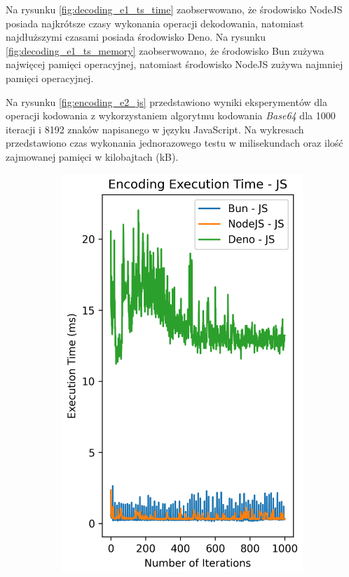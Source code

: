 Na rysunku \ref{fig:decoding_e1_ts_time} zaobserwowano, że środowisko NodeJS posiada najkrótsze czasy wykonania operacji dekodowania, natomiast najdłuższymi czasami posiada środowisko Deno. Na rysunku \ref{fig:decoding_e1_ts_memory} zaobserwowano, że środowisko Bun zużywa najwięcej pamięci operacyjnej, natomiast środowisko NodeJS zużywa najmniej pamięci operacyjnej.

Na rysunku \ref{fig:encoding_e2_js} przedstawiono wyniki eksperymentów dla operacji kodowania z wykorzystaniem algorytmu kodowania \textit{Base64} dla 1000 iteracji i 8192 znaków napisanego w języku JavaScript. Na wykresach przedstawiono czas wykonania jednorazowego testu w milisekundach oraz ilość zajmowanej pamięci w kilobajtach (kB).

\begin{figure}[H]
  \centering
  \begin{subfigure}[b]{0.42\textwidth}
    \centering
    \includegraphics[width=\textwidth]{Figures/coding/base64_1000_encoding_js_time.png}

\end{subfigure}
\end{figure}
